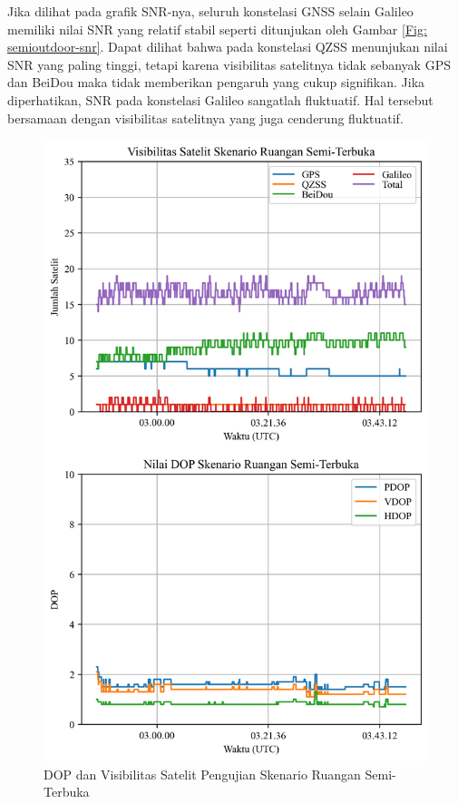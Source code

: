 Jika dilihat pada grafik SNR-nya, seluruh konstelasi GNSS selain Galileo memiliki nilai SNR yang relatif stabil seperti ditunjukan oleh Gambar \ref{Fig: semioutdoor-snr}. Dapat dilihat bahwa pada konstelasi QZSS menunjukan nilai SNR yang paling tinggi, tetapi karena visibilitas satelitnya tidak sebanyak GPS dan BeiDou maka tidak memberikan pengaruh yang cukup signifikan. Jika diperhatikan, SNR pada konstelasi Galileo sangatlah fluktuatif. Hal tersebut bersamaan dengan visibilitas satelitnya yang juga cenderung fluktuatif.

\begin{figure}[H]
	\centering
	\captionsetup{justification=centering}
	\includegraphics[width=11.5cm]{contents/chapter-4/3-skenario-semioutdoor/sats_dop.png}
	\caption{DOP dan Visibilitas Satelit Pengujian Skenario Ruangan Semi-Terbuka}
	\label{Fig: semioutdoor-sats_dop}
\end{figure}

